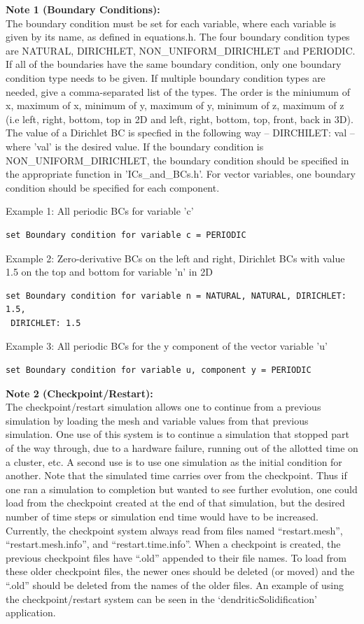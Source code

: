 \documentclass[10pt]{article} %
\begin{document}
\normalsize

\textbf{Note 1 (Boundary Conditions):} \\
The boundary condition must be set for each variable, where each variable is given by its name, as defined in equations.h. The four boundary condition types are NATURAL, DIRICHLET, NON\_UNIFORM\_DIRICHLET and PERIODIC. If all of the boundaries have the same boundary condition, only one boundary condition type needs to be given. If multiple boundary condition types are needed, give a comma-separated list of the types. The order is the miniumum of x, maximum of x, minimum of y, maximum of y, minimum of z, maximum of z (i.e left, right, bottom, top in 2D and left, right, bottom, top, front, back in 3D). The value of a Dirichlet BC is specfied in the following way -- DIRCHILET: val -- where 'val' is the desired value. If the boundary condition is NON\_UNIFORM\_DIRICHLET, the boundary condition should be specified in the appropriate function in 'ICs\_and\_BCs.h'. For vector variables, one boundary condition should be specified for each component.

Example 1: All periodic BCs for variable 'c'
\begin{lstlisting}
set Boundary condition for variable c = PERIODIC
\end{lstlisting}

Example 2: Zero-derivative BCs on the left and right, Dirichlet BCs with value 1.5 on the top and bottom for variable 'n' in 2D
\begin{lstlisting}
set Boundary condition for variable n = NATURAL, NATURAL, DIRICHLET: 1.5,
 DIRICHLET: 1.5
\end{lstlisting}

Example 3: All periodic BCs for the y component of the vector variable 'u'
\begin{lstlisting}
set Boundary condition for variable u, component y = PERIODIC
\end{lstlisting}

\textbf{Note 2 (Checkpoint/Restart):} \\
The checkpoint/restart simulation allows one to continue from a previous simulation by loading the mesh and variable values from that previous simulation. One use of this system is to continue a simulation that stopped part of the way through, due to a hardware failure, running out of the allotted time on a cluster, etc. A second use is to use one simulation as the initial condition for another. Note that the simulated time carries over from the checkpoint. Thus if one ran a simulation to completion but wanted to see further evolution, one could load from the checkpoint created at the end of that simulation, but the desired number of time steps or simulation end time would have to be increased. Currently, the checkpoint system always read from files named ``restart.mesh'', ``restart.mesh.info'', and ``restart.time.info''. When a checkpoint is created, the previous checkpoint files have ``.old'' appended to their file names. To load from these older checkpoint files, the newer ones should be deleted (or moved) and the ``.old'' should be deleted from the names of the older files. An example of using the checkpoint/restart system can be seen in the `dendriticSolidification' application.
\end{document}

